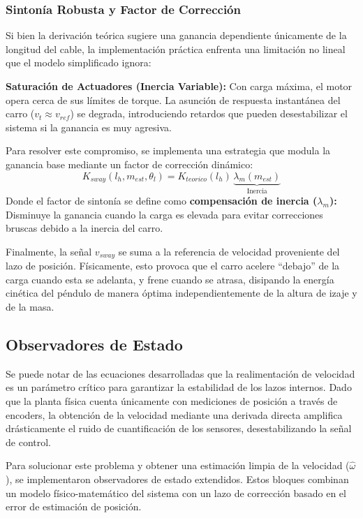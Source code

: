 \documentclass[11pt]{article}                                    %
\begin{document}
\subsubsection{Sintonía Robusta y Factor de Corrección}
Si bien la derivación teórica sugiere una ganancia dependiente únicamente de la longitud del cable, la implementación práctica enfrenta una limitación no lineal que el modelo simplificado ignora:

\textbf{Saturación de Actuadores (Inercia Variable):} Con carga máxima, el motor opera cerca de sus límites de torque. La asunción de respuesta instantánea del carro ($v_t \approx v_{ref}$) se degrada, introduciendo retardos que pueden desestabilizar el sistema si la ganancia es muy agresiva.

Para resolver este compromiso, se implementa una estrategia que modula la ganancia base mediante un factor de corrección dinámico:
\begin{equation}
    K_{sway}(l_h, m_{est}, \theta_l) = K_{teorico}(l_h) \, \underbrace{\lambda_{m}(m_{est})}_{\text{Inercia}}
\end{equation}
Donde el factor de sintonía se define como \textbf{compensación de inercia ($\lambda_{m}$):} Disminuye la ganancia cuando la carga es elevada para evitar correcciones bruscas debido a la inercia del carro.

Finalmente, la señal $ v_{sway}$ se suma a la referencia de velocidad proveniente del lazo de posición. Físicamente, esto provoca que el carro acelere ``debajo'' de la carga cuando esta se adelanta, y frene cuando se atrasa, disipando la energía cinética del péndulo de manera óptima independientemente de la altura de izaje y de la masa. 

\subsection{Observadores de Estado}
Se puede notar de las ecuaciones desarrolladas que la realimentación de velocidad es un parámetro crítico para garantizar la estabilidad de los lazos internos. Dado que la planta física cuenta únicamente con mediciones de posición a través de encoders, la obtención de la velocidad mediante una derivada directa amplifica drásticamente el ruido de cuantificación de los sensores, desestabilizando la señal de control.

Para solucionar este problema y obtener una estimación limpia de la velocidad ($\hat{\omega}$), se implementaron observadores de estado extendidos. Estos bloques combinan un modelo físico-matemático del sistema con un lazo de corrección basado en el error de estimación de posición.
\end{document}
